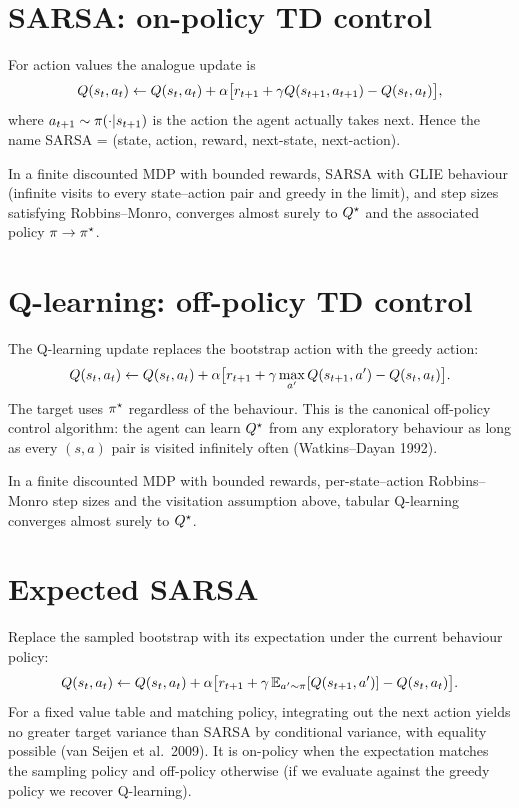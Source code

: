 \documentclass[11pt,oneside]{scrbook}
\begin{document}
\section{SARSA: on-policy TD control}

For action values the analogue update is
\[
  Q(s_t,a_t) \leftarrow Q(s_t,a_t) + \alpha\bigl[r_{t+1} + \gamma Q(s_{t+1},a_{t+1}) - Q(s_t,a_t)\bigr],
\]
where $a_{t+1} \sim \pi(\cdot|s_{t+1})$ is the action the agent actually takes next.
Hence the name SARSA = (state, action, reward, next-state, next-action).

\begin{theorem}
In a finite discounted MDP with bounded rewards, SARSA with GLIE behaviour
(infinite visits to every state--action pair and greedy in the limit),
and step sizes satisfying Robbins--Monro, converges almost surely to $Q^\star$ and the
associated policy $\pi \to \pi^{\star}$.
\end{theorem}

\section{Q-learning: off-policy TD control}

The Q-learning update replaces the bootstrap action with the greedy action:
\[
  Q(s_t,a_t) \leftarrow Q(s_t,a_t) + \alpha\bigl[r_{t+1} + \gamma \max_{a'} Q(s_{t+1},a') - Q(s_t,a_t)\bigr].
\]
The target uses $\pi^{\star}$ regardless of the behaviour. This is the canonical off-policy
control algorithm: the agent can learn $Q^\star$ from any exploratory behaviour as long
as every $(s,a)$ pair is visited infinitely often (Watkins--Dayan 1992).

\begin{theorem}
In a finite discounted MDP with bounded rewards, per-state--action
Robbins--Monro step sizes and the visitation assumption above, tabular Q-learning
converges almost surely to $Q^\star$.
\end{theorem}

\section{Expected SARSA}

Replace the sampled bootstrap with its expectation under the current behaviour policy:
\[
  Q(s_t,a_t) \leftarrow Q(s_t,a_t) + \alpha\bigl[r_{t+1} + \gamma\,\mathbb{E}_{a'\sim\pi}[Q(s_{t+1},a')] - Q(s_t,a_t)\bigr].
\]
For a fixed value table and matching policy, integrating out the next action
yields no greater target variance than SARSA by conditional variance, with
equality possible (van Seijen et al.\ 2009).
It is on-policy when the expectation matches the sampling policy and off-policy otherwise
(if we evaluate against the greedy policy we recover Q-learning).
\end{document}

